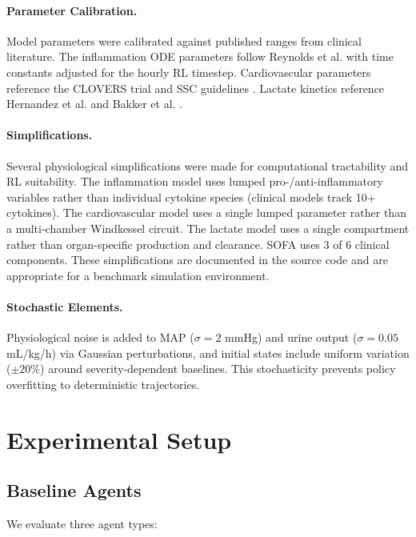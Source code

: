 \documentclass[11pt,a4paper]{article}
\begin{document}
\paragraph{Parameter Calibration.}
Model parameters were calibrated against published ranges from clinical literature. The inflammation ODE parameters follow Reynolds et al. \citep{reynolds2006reduced} with time constants adjusted for the hourly RL timestep. Cardiovascular parameters reference the CLOVERS trial \citep{shapiro2023clovers} and SSC guidelines \citep{rhodes2017surviving}. Lactate kinetics reference Hernandez et al. \citep{hernandez2020lactate} and Bakker et al. \citep{bakker2022lactate}.

\paragraph{Simplifications.}
Several physiological simplifications were made for computational tractability and RL suitability. The inflammation model uses lumped pro-/anti-inflammatory variables rather than individual cytokine species (clinical models track 10+ cytokines). The cardiovascular model uses a single lumped parameter rather than a multi-chamber Windkessel circuit. The lactate model uses a single compartment rather than organ-specific production and clearance. SOFA uses 3 of 6 clinical components. These simplifications are documented in the source code and are appropriate for a benchmark simulation environment.

\paragraph{Stochastic Elements.}
Physiological noise is added to MAP ($\sigma = 2$ mmHg) and urine output ($\sigma = 0.05$ mL/kg/h) via Gaussian perturbations, and initial states include uniform variation ($\pm 20\%$) around severity-dependent baselines. This stochasticity prevents policy overfitting to deterministic trajectories.

\section{Experimental Setup}

\subsection{Baseline Agents}

We evaluate three agent types:
\end{document}
